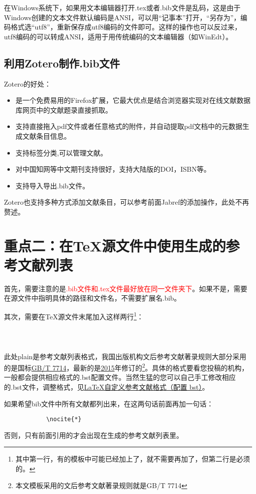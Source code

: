 \documentclass[cn,geye,cyan,normal,14pt]{elegantnote}
\begin{document}
	\begin{note}
在Windows系统下，如果用文本编辑器打开.tex或者.bib文件是乱码，这是由于Windows创建的文本文件默认编码是ANSI，可以用“记事本”打开，“另存为”，编码格式选“utf8”，重新保存成utf8编码的文件即可。这样的操作也可以反过来，utf8编码的可以转成ANSI，适用于用传统编码的文本编辑器（如WinEdt）。
	\end{note}
\subsection{利用Zotero制作.bib文件}
Zotero的好处：
\begin{itemize}
	\item 是一个免费易用的Firefox扩展，它最大优点是结合浏览器实现对在线文献数据库网页中的文献题录直接抓取。
	\item 支持直接拖入pdf文件或者任意格式的附件，并自动提取pdf文档中的元数据生成文献条目信息。
	\item 支持标签分类,可以管理文献。
	\item 对中国知网等中文期刊支持很好，支持大陆版的DOI，ISBN等。
	\item 支持导入导出.bib文件。
\end{itemize}
		Zotero也支持多种方式添加文献条目，可以参考前面Jabref的添加操作，此处不再赘述。
\section{重点二：在\TeX 源文件中使用生成的参考文献列表}
首先，需要注意的是\textcolor{red}{.bib文件和.tex文件最好放在同一文件夹下}。如果不是，需要在源文件中指明具体的路径和文件名，不需要扩展名.bib。\par
其次，需要在\TeX 源文件末尾加入这样两行\footnote{其中第一行，有的模板中可能已经加上了，就不需要再加了，但第二行是必须的。}：
		\begin{lstlisting}
			
			
		\end{lstlisting}
			\begin{note}
				此处plain是参考文献列表格式，我国出版机构文后参考文献著录规则大部分采用的是国标\href{http://www.sac.gov.cn/SACSearch/outlinetemplet/gjbzcx.jsp}{GB/T 7714}\cite{gbt7714_2015}，最新的是\href{http://www.scal.edu.cn/dxtsgxb/201906120155}{2015}年修订的\footnote{本文模板采用的文后参考文献著录规则就是GB/T 7714}。具体的格式要看您投稿的机构，一般都会提供相应格式的.bst配置文件。当然生猛的您可以自己手工修改相应的.bst文件，调整格式，见\href{https://blog.csdn.net/chikily_yongfeng/article/details/86553359}{\LaTeX 自定义参考文献格式（配置 bst）}\cite{noauthor_latex_nodate}。
			\end{note}
如果希望bib文件中所有文献都列出来，在这两句话前面再加一句话：
		\begin{lstlisting}
			\nocite{*}
		\end{lstlisting}
否则，只有前面引用的才会出现在生成的参考文献列表里。
\end{document}
